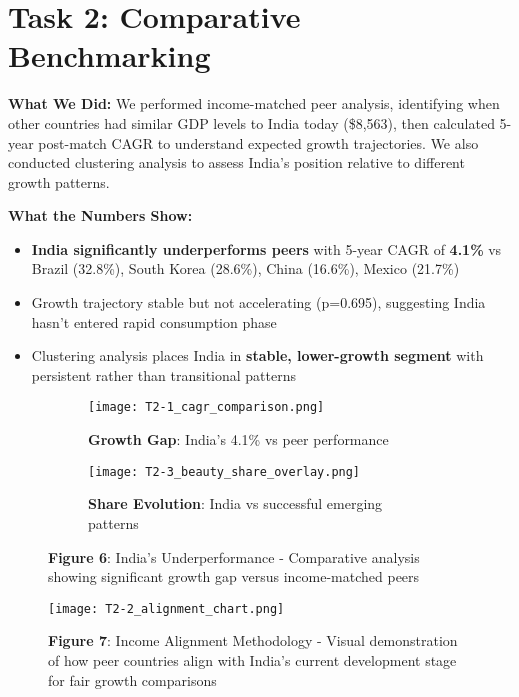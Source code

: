 \documentclass[11pt]{article}
\begin{document}
\section{Task 2: Comparative Benchmarking}

\textbf{What We Did:} We performed income-matched peer analysis, identifying when other countries had similar GDP levels to India today (\$8,563), then calculated 5-year post-match CAGR to understand expected growth trajectories. We also conducted clustering analysis to assess India's position relative to different growth patterns.

\textbf{What the Numbers Show:}
\vspace{-3pt}
\begin{itemize}
    \setlength{\itemsep}{1pt}
    \item \textbf{India significantly underperforms peers} with 5-year CAGR of \textbf{4.1\%} vs Brazil (32.8\%), South Korea (28.6\%), China (16.6\%), Mexico (21.7\%)
    \item Growth trajectory stable but not accelerating (p=0.695), suggesting India hasn't entered rapid consumption phase
    \item Clustering analysis places India in \textbf{stable, lower-growth segment} with persistent rather than transitional patterns
\end{itemize}

\begin{figure}[H]
\centering
\begin{subfigure}[b]{0.48\textwidth}
    \texttt{[image: T2-1\_cagr\_comparison.png]}
    \caption{\textbf{Growth Gap}: India's 4.1\% vs peer performance}
\end{subfigure}
\hfill
\begin{subfigure}[b]{0.48\textwidth}
    \texttt{[image: T2-3\_beauty\_share\_overlay.png]}
    \caption{\textbf{Share Evolution}: India vs successful emerging patterns}
\end{subfigure}
\caption{\textbf{Figure 6}: India's Underperformance - Comparative analysis showing significant growth gap versus income-matched peers}
\end{figure}

\begin{figure}[H]
\centering
\texttt{[image: T2-2\_alignment\_chart.png]}
\caption{\textbf{Figure 7}: Income Alignment Methodology - Visual demonstration of how peer countries align with India's current development stage for fair growth comparisons}
\end{figure}
\end{document}
